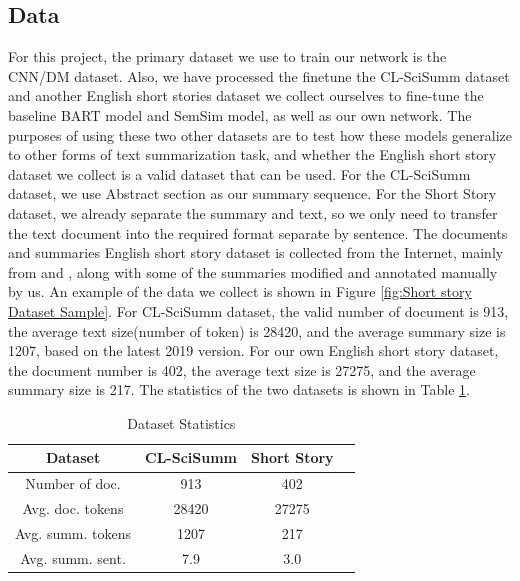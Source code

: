 \documentclass[11pt,a4paper]{article}
\begin{document}
\subsection{Data}
For this project, the primary dataset we use to train our network is the CNN/DM dataset. Also, we have processed the finetune the CL-SciSumm\cite{scisumm} dataset and another English short stories dataset we collect ourselves to fine-tune the baseline BART\cite{lewis2019bart} model and SemSim\cite{yoon2020learning} model, as well as our own network. The purposes of using these two other datasets are to test how these models generalize to other forms of text summarization task, and whether the English short story dataset we collect is a valid dataset that can be used. For the CL-SciSumm dataset, we use Abstract section as our summary sequence. For the Short Story dataset, we already separate the summary and text, so we only need to transfer the text document into the required format separate by sentence. The documents and summaries English short story dataset is collected from the Internet, mainly from \cite{ssg} and \cite{ssacl}, along with some of the summaries modified and annotated manually by us. An example of the data we collect is shown in Figure \ref{fig:Short story Dataset Sample}. For CL-SciSumm dataset, the valid number of document is 913, the average text size(number of token) is 28420, and the average summary size is 1207, based on the latest 2019 version. For our own English short story dataset, the document number is 402, the average text size is 27275, and the average summary size is 217. The statistics of the two datasets is shown in Table \ref{tab:data_stat}.

\begin{table}[h!]
    \centering
    \begin{tabular}{|c|c|c|c|}
    \hline
        Dataset & CL-SciSumm & Short Story \\\hline
        Number of doc. & 913  &  402 \\\hline
        Avg. doc. tokens & 28420 & 27275  \\\hline
        Avg. summ. tokens & 1207 & 217  \\\hline
        Avg. summ. sent. & 7.9 & 3.0\\\hline
    \end{tabular}
    \caption{Dataset Statistics}
    \label{tab:data_stat}
\end{table}
\end{document}
